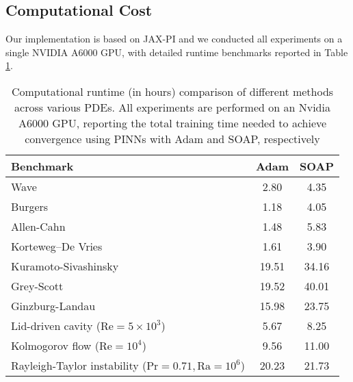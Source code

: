 \subsection{Computational Cost}
Our implementation is based on JAX-PI \cite{wang2023expert} and we conducted all experiments on a single NVIDIA A6000 GPU, with detailed runtime benchmarks reported in Table \ref{tab: cost}. 

\begin{table}
\centering
\renewcommand{\arraystretch}{1.4}
\caption{Computational runtime (in hours) comparison of different methods across various PDEs. All experiments are performed on an Nvidia A6000 GPU, reporting the total training time needed to achieve convergence using PINNs with Adam and SOAP, respectively}
\label{tab: cost}
\begin{tabular}{l cc}
\toprule
\textbf{Benchmark} & \multicolumn{1}{c}{\textbf{Adam}  } & \multicolumn{1}{c}{\textbf{SOAP}  } \\
\midrule
Wave  & 2.80 &  4.35\\
Burgers  & 1.18  & 4.05 \\
Allen-Cahn  & 1.48 & 5.83 \\
Korteweg–De Vries  & 1.61 & 3.90 \\
Kuramoto-Sivashinsky & 19.51 & 34.16\\
Grey-Scott & 19.52 & 40.01\\
Ginzburg-Landau  & 15.98 & 23.75 \\
Lid-driven cavity ($\text{Re}=5 \times 10^3$) & 5.67 & 8.25 \\
Kolmogorov flow ($\text{Re}=10^4$) & 9.56 & 11.00 \\
Rayleigh-Taylor instability ($\text{Pr}=0.71, \text{Ra}=10^6$) & 20.23 & 21.73 \\
\bottomrule
\end{tabular}
\vspace{1mm}
\end{table}




